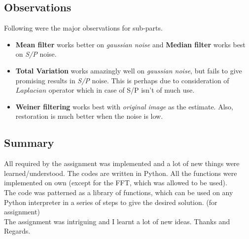\documentclass{article}
\begin{document}
    \subsection*{Observations}
    Following were the major observations for sub-parts.
    \begin{itemize}[topsep=0cm]
        \item \textbf{Mean filter} works better on \textit{gaussian noise} and \textbf{Median filter} works best on \textit{S/P} noise.
        \item \textbf{Total Variation} works amazingly well on \textit{gaussian noise}, but fails to give promising results in \textit{S/P} noise. This is perhaps due to consideration of \(Laplacian\) operator which in case of S/P isn't of much use.
        \item \textbf{Weiner filtering} works best with \textit{original image} as the estimate. Also, restoration is much better when the noise is low.
    \end{itemize}

    \subsection*{Summary}
    All required by the assignment was implemented and a lot of new things were learned/understood. The codes are written in Python. All the functions were implemented on own (except for the FFT, which was allowed to be used). \\
    The code was patterned as a library of functions, which can be used on any Python interpreter in a series of steps to give the desired solution. (for assignment)\\
    The assignment was intriguing and I learnt a lot of new ideas. Thanks and Regards.
    
\end{document}
